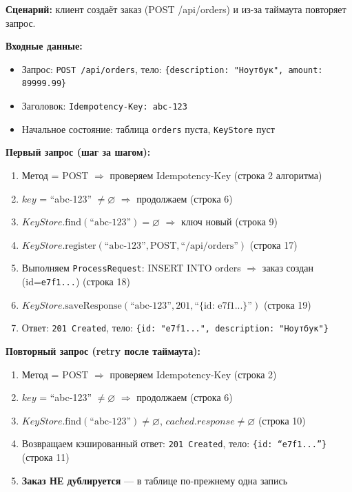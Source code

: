 \textbf{Сценарий:} клиент создаёт заказ (POST /api/orders) и из-за таймаута повторяет запрос.

\textbf{Входные данные:}
\begin{itemize}
    \item Запрос: \texttt{POST /api/orders}, тело: \texttt{\{description: "Ноутбук", amount: 89999.99\}}
    \item Заголовок: \texttt{Idempotency-Key: abc-123}
    \item Начальное состояние: таблица \texttt{orders} пуста, \texttt{KeyStore} пуст
\end{itemize}

\textbf{Первый запрос (шаг за шагом):}
\begin{enumerate}
    \item Метод = POST $\Rightarrow$ проверяем Idempotency-Key (строка 2 алгоритма)
    \item $key$ = ``abc-123'' $\neq \varnothing$ $\Rightarrow$ продолжаем (строка 6)
    \item $KeyStore.\text{find}(\text{``abc-123''}) = \varnothing$ $\Rightarrow$ ключ новый (строка 9)
    \item $KeyStore.\text{register}(\text{``abc-123''}, \text{POST}, \text{``/api/orders''})$ (строка 17)
    \item Выполняем \texttt{ProcessRequest}: INSERT INTO orders $\Rightarrow$ заказ создан (id=\texttt{e7f1...}) (строка 18)
    \item $KeyStore.\text{saveResponse}(\text{``abc-123''}, 201, \text{``\{id: e7f1...\}''})$ (строка 19)
    \item Ответ: \texttt{201 Created}, тело: \texttt{\{id: "e7f1...", description: "Ноутбук"\}}
\end{enumerate}

\textbf{Повторный запрос (retry после таймаута):}
\begin{enumerate}
    \item Метод = POST $\Rightarrow$ проверяем Idempotency-Key (строка 2)
    \item $key$ = ``abc-123'' $\neq \varnothing$ $\Rightarrow$ продолжаем (строка 6)
    \item $KeyStore.\text{find}(\text{``abc-123''}) \neq \varnothing$, $cached.response \neq \varnothing$ (строка 10)
    \item Возвращаем кэшированный ответ: \texttt{201 Created}, тело: \texttt{\{id: ``e7f1...''\}} (строка 11)
    \item \textbf{Заказ НЕ дублируется} --- в таблице по-прежнему одна запись
\end{enumerate}

